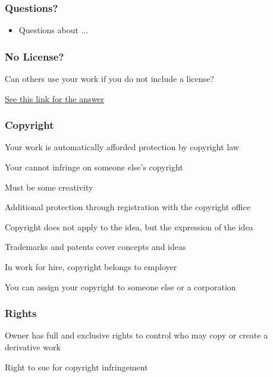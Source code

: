 \documentclass[t,12pt,numbers,fleqn]{beamer}
\begin{document}

\begin{frame}
\frametitle{Questions?}
\begin{itemize}
\item Questions about ...
\end{itemize}
\end{frame}


\begin{frame}
\frametitle{No License?}

\bi
\item Can others use your work if you do not include a license?
\item \href{http://choosealicense.com/no-license/}{See this link for the answer}
\ei

\end{frame}


\begin{frame}
\frametitle{Copyright}

\bi
\item Your work is automatically afforded protection by copyright law
\bi
\item Your cannot infringe on someone else's copyright
\item Must be some creativity
\ei
\item Additional protection through registration with the copyright office
\item Copyright does not apply to the idea, but the expression of the idea
\item Trademarks and patents cover concepts and ideas
\item In work for hire, copyright belongs to employer
\item You can assign your copyright to someone else or a corporation
\ei

\end{frame}


\begin{frame}
\frametitle{Rights}

\bi
\item Owner has full and exclusive rights to control who may copy or create a
  derivative work
\item Right to sue for copyright infringement
\ei

\end{frame}
\end{document}
